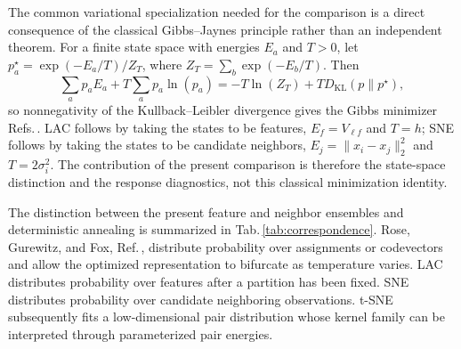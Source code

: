 \documentclass[11pt,a4paper]{article}
\newcommand{\KL}{D_{\mathrm{KL}}}
\theoremstyle{definition}
\theoremstyle{plain}
\begin{document}
The common variational specialization needed for the comparison is a direct consequence of the classical Gibbs--Jaynes principle rather than an independent theorem. For a finite state space with energies $E_a$ and $T>0$, let $p_a^\star=\exp(-E_a/T)/Z_T$, where $Z_T=\sum_b\exp(-E_b/T)$. Then
\begin{equation}
    \sum_a p_aE_a+T\sum_a p_a\ln\left(p_a\right)
    =-T\ln\left(Z_T\right)+T\KL\left(p\middle\|p^\star\right),
    \label{eq:common_variational_kl_decomposition}
\end{equation}
so nonnegativity of the Kullback--Leibler divergence gives the Gibbs minimizer Refs.\,\cite{gibbs1902,jaynes1957,kullback1951}. LAC follows by taking the states to be features, $E_f=V_{\ell f}$ and $T=h$; SNE follows by taking the states to be candidate neighbors, $E_j=\|x_i-x_j\|_2^2$ and $T=2\sigma_i^2$. The contribution of the present comparison is therefore the state-space distinction and the response diagnostics, not this classical minimization identity.


The distinction between the present feature and neighbor ensembles and deterministic annealing is summarized in Tab.\,\ref{tab:correspondence}. Rose, Gurewitz, and Fox, Ref.\,\cite{rose1990phase}, distribute probability over assignments or codevectors and allow the optimized representation to bifurcate as temperature varies. LAC distributes probability over features after a partition has been fixed. SNE distributes probability over candidate neighboring observations. t-SNE subsequently fits a low-dimensional pair distribution whose kernel family can be interpreted through parameterized pair energies.
\end{document}
